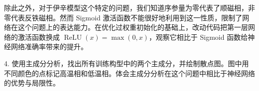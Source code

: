 \begin{exerciseBox}[大作业（续）]
除此之外，对于伊辛模型这个特定的问题，我们知道序参量为零代表了顺磁相，非零代表反铁磁相。然而 Sigmoid 激活函数不能很好地利用到这一性质，限制了网络在这个问题上的表达能力。在优化过权重初始化的基础上，改动代码把第一层网络的激活函数换成 $\operatorname{ReLU}(x)=\max(0,x)$，观察它相比于 Sigmoid 函数给神经网络准确率带来的提升。

4. 使用主成分分析，找出所有训练构型中的两个主成分，并绘制散点图。图中用不同颜色的点标记高温相和低温相。体会主成分分析在这个问题中相比于神经网络的优势与局限性。
\end{exerciseBox}

